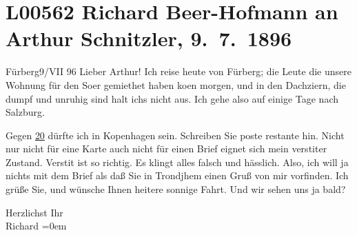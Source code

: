 

\section[Richard Beer-Hofmann an Arthur Schnitzler, 9. 7. 1896]{L00562 Richard Beer-Hofmann an Arthur Schnitzler, 9. 7. 1896}
\nopagebreak{}
\rehead{ }\normalsize\beginnumbering{}
\toendnotes[C]{\smallbreak\pagebreak[2]}
\pstart
           \raggedleft{}{\pb}Fürberg9/VII 96\pend
           \vspace{0.5em}
\pstart
           Lieber Arthur! Ich reise heute von Fürberg; die Leute die unsere Wohnung für den So{\geminationm}er gemiethet haben ko{\geminationm}en morgen, und in den Dachzi{\geminationm}ern, die dumpf und unruhig sind halt ichs nicht aus.
               Ich gehe also auf einige Tage nach Salzburg.\pend
           
\pstart
           Gegen \uline{20} dürfte ich in Kopenhagen sein.
               Schreiben Sie poste restante hin. Nicht {\pb}nur nicht für eine Karte auch nicht
               für einen Brief eignet sich mein versti{\geminationm}ter Zustand.
                  Versti{\geminationm}t ist so richtig. Es klingt alles falsch und
               hässlich. Also, ich will ja nichts mit dem Brief als daß Sie in Trondjhem einen Gruß von mir vorfinden. Ich grüße Sie, und
               wünsche Ihnen heitere sonnige {\pb}Fahrt. Und wir sehen uns ja bald?\pend
           
\pstart
           Herzlichst Ihr{\\[\baselineskip]}\spacefill\mbox{Richard}\pend
           \leftskip=0em{}\endnumbering{}  
      
